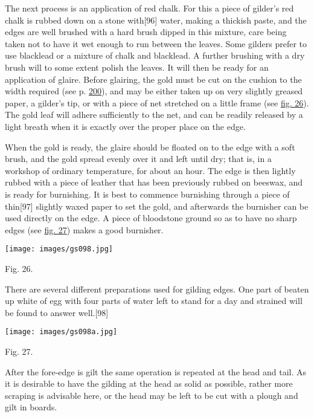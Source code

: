 \documentclass[
]{article}
\begin{document}
The next process is an application of red chalk. For this a piece of
gilder's red chalk is rubbed down on a stone
with{\protect\hypertarget{Page_96}{}{{[}96{]}}} water, making a thickish
paste, and the edges are well brushed with a hard brush dipped in this
mixture, care being taken not to have it wet enough to run between the
leaves. Some gilders prefer to use blacklead or a mixture of chalk and
blacklead. A further brushing with a dry brush will to some extent
polish the leaves. It will then be ready for an application of glaire.
Before glairing, the gold must be cut on the cushion to the width
required (see p. \protect\hyperlink{Page_200}{200}), and may be either
taken up on very slightly greased paper, a gilder's tip, or with a piece
of net stretched on a little frame (see \protect\hyperlink{Fig_26}{fig.
26}). The gold leaf will adhere sufficiently to the net, and can be
readily released by a light breath when it is exactly over the proper
place on the edge.

When the gold is ready, the glaire should be floated on to the edge with
a soft brush, and the gold spread evenly over it and left until dry;
that is, in a workshop of ordinary temperature, for about an hour. The
edge is then lightly rubbed with a piece of leather that has been
previously rubbed on beeswax, and is ready for burnishing. It is best to
commence burnishing through a piece of
thin{\protect\hypertarget{Page_97}{}{{[}97{]}}} slightly waxed paper to
set the gold, and afterwards the burnisher can be used directly on the
edge. A piece of bloodstone ground so as to have no sharp edges (see
\protect\hyperlink{Fig_27}{fig. 27}) makes a good burnisher.

\protect\hypertarget{Fig_26}{}{}
\texttt{[image: images/gs098.jpg]}

Fig. 26.

There are several different preparations used for gilding edges. One
part of beaten up white of egg with four parts of water left to stand
for a day and strained will be found to answer
well.{\protect\hypertarget{Page_98}{}{{[}98{]}}}

\protect\hypertarget{Fig_27}{}{}
\texttt{[image: images/gs098a.jpg]}

Fig. 27.

After the fore-edge is gilt the same operation is repeated at the head
and tail. As it is desirable to have the gilding at the head as solid as
possible, rather more scraping is advisable here, or the head may be
left to be cut with a plough and gilt in boards.
\end{document}
